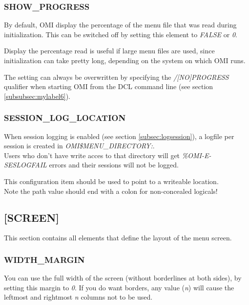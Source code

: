 \documentclass[a4paper]{book}
\newcommand{\vs}{\vspace{3mm}}
\begin{document}
\subsubsection{SHOW{\_}PROGRESS}
\label{para:mylabel2}

By default, OMI display the percentage of the menu file that was read during 
initialization. This can be switched off by setting this element to \textsl{FALSE} or \textsl{0}.

\vs

Display the percentage read is useful if large menu files are used, since 
initialization can take pretty long, depending on the system on which OMI 
runs.

\vs

The setting can always be overwritten by specifying the \textsl{/[NO]PROGRESS} 
qualifier when starting OMI from the DCL command line (see section
\ref{subsubsec:mylabel6}).

\subsubsection{SESSION{\_}LOG{\_}LOCATION}\label{para:sessionlogfile}

When session logging is enabled (see section \ref{subsec:logsession}), a logfile per session is created in \textsl{OMI{\$}MENU{\_}DIRECTORY:}. \\
Users who don't have write acces to that directory will get \textsl{\%OMI-E-SESLOGFAIL} errors and their sessions will not be logged.

This configuration item should be used to point to a writeable location.\\
Note the path value should end with a colon for non-concealed logicals!

\subsection{[SCREEN]}
\label{subsubsec:mylabel17}

This section contains all elements that define the layout of the menu 
screen.

\subsubsection{WIDTH{\_}MARGIN}

You can use the full width of the screen (without borderlines at both 
sides), by setting this margin to \textsl{0}. If you do want borders, any value 
(\textit{n}) will cause the leftmost and rightmost \textit{n} columns not to be used.
\end{document}
